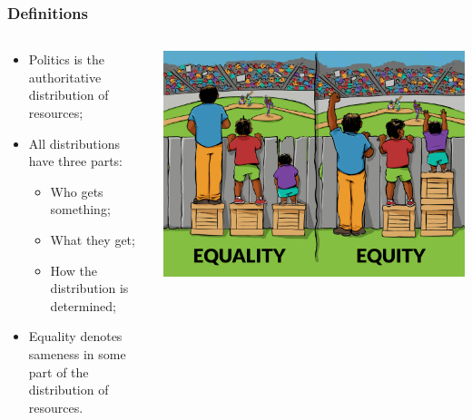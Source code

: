 \documentclass[aspectratio=169]{beamer}
\theoremstyle{principle}
\begin{document}
\begin{frame}
\frametitle{Definitions}
\begin{columns}
\begin{column}{0.5\textwidth}

\begin{itemize}
\item Politics is the authoritative distribution of resources;
\bigskip
\bigskip
\item All distributions have three parts:
\begin{itemize}
\item Who gets something;
\item What they get;
\item How the distribution is determined;
\end{itemize}
\bigskip
\bigskip
\item Equality denotes sameness in some part of the distribution of resources.
\end{itemize}
\end{column}

\begin{column}{0.5\textwidth}
\begin{center}
\includegraphics[scale=0.25]{EqualityEquity.png}
\end{center}
\end{column}
\end{columns}
\end{frame}

\end{document}
